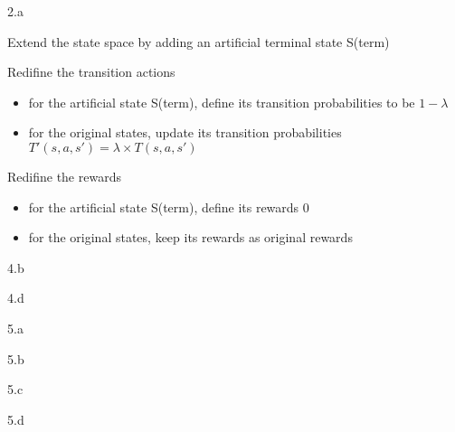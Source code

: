 \LARGE
2.a
\normalsize

\begin{answer}
  Extend the state space by adding an artificial terminal state S(term)

  Redifine the transition actions
  \begin{itemize}
    \item for the artificial state S(term), define its transition probabilities to be $1-\lambda$ 
    \item for the original states, update its transition probabilities $T'(s,a,s')=\lambda\times T(s,a,s')$
  \end{itemize}

  Redifine the rewards
  \begin{itemize}
    \item for the artificial state S(term), define its rewards $0$ 
    \item for the original states, keep its rewards as original rewards
  \end{itemize}
\end{answer}
\clearpage

\LARGE
4.b
\normalsize

\begin{answer}
\end{answer}
\clearpage

\LARGE
4.d
\normalsize

\begin{answer}
\end{answer}
\clearpage

\LARGE
5.a
\normalsize

\begin{answer}
\end{answer}
\clearpage

\LARGE
5.b
\normalsize

\begin{answer}
\end{answer}
\clearpage


\LARGE
5.c
\normalsize

\begin{answer}
\end{answer}
\clearpage


\LARGE
5.d
\normalsize

\begin{answer}
\end{answer}

\clearpage

